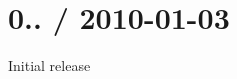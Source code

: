 {\ttfamily \section*{0.. / 2010-\/01-\/03 }}

{\ttfamily }

{\ttfamily 
\begin{DoxyItemize}
\item Initial release 
\end{DoxyItemize}}